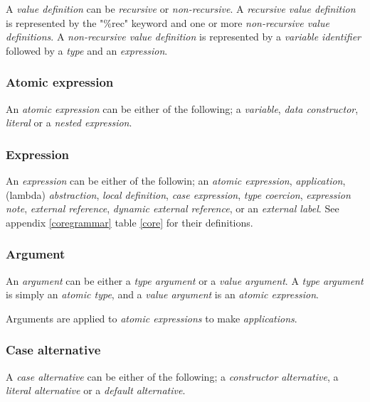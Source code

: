 A \emph{value definition} can be \emph{recursive} or \emph{non-recursive}. A 
\emph{recursive value definition} is represented by the "\%rec" keyword and one or more 
\emph{non-recursive value definitions}. A \emph{non-recursive value definition} 
is represented by a \emph{variable identifier} followed by a \emph{type} and 
an \emph{expression}.\cite{tolmach2010ghc}



\subsubsection{Atomic expression}

An \emph{atomic expression} can be either of the following; a \emph{variable}, 
\emph{data constructor}, \emph{literal} or a \emph{nested expression}.\cite{tolmach2010ghc}




\subsubsection{Expression}

An \emph{expression} can be either of the followin; an \emph{atomic expression},
\emph{application}, (lambda) \emph{abstraction}, \emph{local definition}, 
\emph{case expression},
\emph{type coercion}, \emph{expression note}, \emph{external reference}, 
\emph{dynamic external reference}, or an \emph{external label}. See appendix 
\ref{coregrammar} table \ref{core} for their definitions.\cite{tolmach2010ghc}



\subsubsection{Argument}

An \emph{argument} can be either a \emph{type argument} or a \emph{value argument}. 
A \emph{type argument} is simply an \emph{atomic type}, and a \emph{value argument} is an 
\emph{atomic expression}.

Arguments are applied to \emph{atomic expressions} to make \emph{applications}.\cite{tolmach2010ghc}


\subsubsection{Case alternative}

A \emph{case alternative} can be either of the following; a 
\emph{constructor alternative}, a \emph{literal alternative} or a 
\emph{default alternative}.\cite{tolmach2010ghc}



